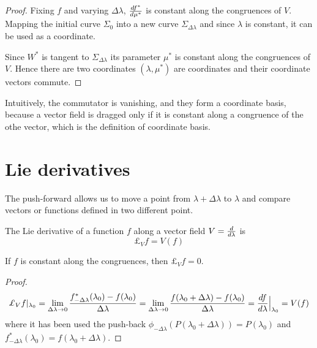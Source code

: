     \begin{proof}
        Fixing $f$ and varying $\Delta \lambda$, $\frac{df^*}{d\mu^*}$ is constant along the congruences of $V$. Mapping the initial curve $\Sigma_0$ into a new curve $\Sigma_{\Delta \lambda}$ and since $\lambda$ is constant, it can be used as a coordinate. 

        Since $W^*$ is tangent to $\Sigma_{\Delta \lambda}$ its parameter $\mu^*$ is constant along the congruences of $V$. Hence there are two coordinates $(\lambda, \mu^*)$ are coordinates and their coordinate vectors commute.
    \end{proof}

    Intuitively, the commutator is vanishing, and they form a coordinate basis, because a vector field is dragged only if it is constant along a congruence of the othe vector, which is the definition of coordinate basis.

\section{Lie derivatives}

    The push-forward allows us to move a point from $\lambda + \Delta \lambda$ to $\lambda$ and compare vectors or functions defined in two different point.

    \begin{definition}
        The Lie derivative of a function $f$ along a vector field $V=\frac{d}{d\lambda}$ is 
        \begin{equation} \label{liederf}
            \pounds_{V} f =  V(f)
        \end{equation}
        
    \end{definition} 
    If $f$ is constant along the congruences, then $\pounds_V f = 0$.

    \begin{proof}
        \begin{equation*}
            \pounds_{V} f \vert_{\lambda_0} = \lim_{\Delta \lambda \rightarrow 0} \frac{f^*_{-\Delta \lambda}(\lambda_0) - f(\lambda_0)}{\Delta \lambda} = \lim_{\Delta \lambda \rightarrow 0} \frac{f(\lambda_0 + \Delta \lambda)- f(\lambda_0)}{\Delta \lambda} = \dv{f}{\lambda} \Big \vert_{\lambda_0} = V(f)
        \end{equation*}
        where it has been used the push-back $\phi_{-\Delta\lambda} (P(\lambda_0 + \Delta \lambda)) = P(\lambda_0)$ and $f^*_{-\Delta\lambda} (\lambda_0) = f (\lambda_0 + \Delta \lambda)$.
    \end{proof}

